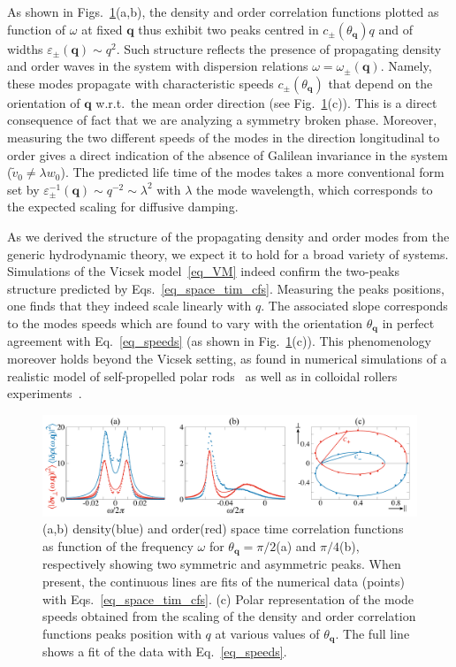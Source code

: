 As shown in Figs.~\ref{figmodes}(a,b), the density and order correlation functions plotted as function of $\omega$ at fixed $\bm q$ thus exhibit two peaks centred in $c_\pm(\theta_{\bm q})q$ and of widths $\varepsilon_\pm(\bm q)\sim q^2$.
Such structure reflects the presence of propagating density and order waves in the system with dispersion relations $\omega = \omega_\pm(\bm q)$.
Namely, these modes propagate with characteristic speeds $c_\pm(\theta_{\bm q})$ that depend on the orientation of $\bm q$ w.r.t.\ the mean order direction (see Fig.~\ref{figmodes}(c)). 
This is a direct consequence of fact that we are analyzing a symmetry broken phase.
Moreover, measuring the two different speeds of the modes in the direction longitudinal to order gives 
a direct indication of the absence of Galilean invariance in the system ($\tilde{v}_0 \ne \lambda w_0$).
The predicted life time of the modes takes a more conventional form set by $\varepsilon^{-1}_\pm(\bm q)\sim q^{-2} \sim \lambda^2$ with $\lambda$ the mode wavelength, which corresponds to the expected scaling for diffusive damping.

As we derived the structure of the propagating density and order modes from the generic hydrodynamic theory, 
we expect it to hold for a broad variety of systems.
Simulations of the Vicsek model~\eqref{eq_VM} indeed confirm the two-peaks structure predicted by Eqs.~\eqref{eq_space_tim_cfs}.
Measuring the peaks positions, one finds that they indeed scale linearly with $q$. 
The associated slope corresponds to the modes speeds which are found to vary with the orientation $\theta_{\bm q}$ 
in perfect agreement with Eq.~\eqref{eq_speeds} (as shown in Fig.~\ref{figmodes}(c)).
This phenomenology moreover holds beyond the Vicsek setting, as found in numerical simulations of a realistic model of self-propelled polar rods~\cite{Soni2020}
as well as in colloidal rollers experiments~\cite{geyer2018sounds}.

\begin{figure}[t!]
	\includegraphics[width=\textwidth]{Figures/figmodes.pdf}
	\caption{(a,b) density(blue) and order(red) space time correlation functions as function of the frequency $\omega$ for $\theta_{\bm q} = \pi/2$(a) and $\pi/4$(b),
	respectively showing two symmetric and asymmetric peaks.
	When present, the continuous lines are fits of the numerical data (points) with Eqs.~\eqref{eq_space_tim_cfs}.
	(c) Polar representation of the mode speeds obtained from the scaling of the density and order correlation functions peaks position with $q$ at various values of $\theta_{\bm q}$. 
	The full line shows a fit of the data with Eq.~\eqref{eq_speeds}.}
	\label{figmodes}
\end{figure}

